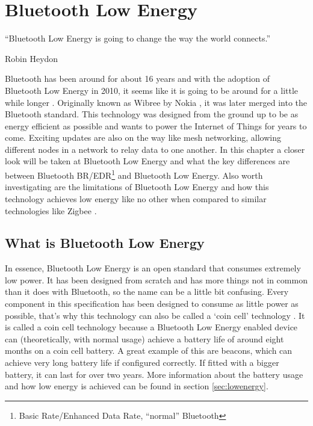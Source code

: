 \documentclass[pdftex,a4paper,12pt,twoside]{report}
\begin{document}
\chapter{Bluetooth Low Energy}
\label{ch:ble}
\epigraph{``Bluetooth Low Energy is going to change the way the world connects.''}{Robin Heydon}
Bluetooth has been around for about 16 years and with the adoption of Bluetooth Low Energy in 2010, it seems like it is going to be around for a little while longer \citep{bluetoothsig2016}. Originally known as Wibree by Nokia \citep{nokia2006}, it was later merged into the Bluetooth standard. This technology was designed from the ground up \citep{gupta2013inside} to be as energy efficient as possible and wants to power the Internet of Things for years to come. Exciting updates are also on the way like mesh networking, allowing different nodes in a network to relay data to one another. In this chapter a closer look will be taken at Bluetooth Low Energy and what the key differences are between Bluetooth BR/EDR\footnote{Basic Rate/Enhanced Data Rate, ``normal'' Bluetooth} and Bluetooth Low Energy. Also worth investigating are the limitations of Bluetooth Low Energy and how this technology achieves low energy like no other when compared to similar technologies like Zigbee \citep{siekkinen2012low}.

\newpage{}

\section{What is Bluetooth Low Energy}
\label{sec:whatis}
In essence, Bluetooth Low Energy is an open standard that consumes extremely low power. It has been designed from scratch and has more things not in common than it does with Bluetooth, so the name can be a little bit confusing. Every component in this specification has been designed to consume as little power as possible, that's why this technology can also be called a `coin cell' technology \citep{bluetooth2016training}. It is called a coin cell technology because a Bluetooth Low Energy enabled device can (theoretically, with normal usage) achieve a battery life of around eight months on a coin cell battery. A great example of this are beacons, which can achieve very long battery life if configured correctly. If fitted with a bigger battery, it can last for over two years. More information about the battery usage and how low energy is achieved can be found in section \ref{sec:lowenergy}.
\end{document}
